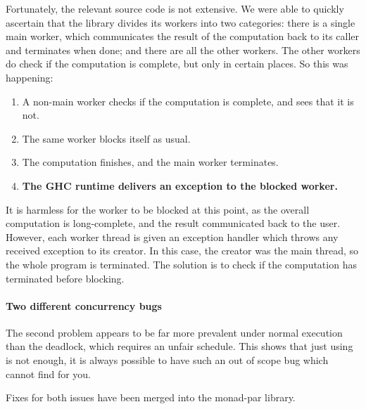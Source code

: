 Fortunately, the relevant source code is not extensive.  We were able
to quickly ascertain that the library divides its workers into two
categories: there is a single main worker, which communicates the
result of the computation back to its caller and terminates when done;
and there are all the other workers.  The other workers do check if
the computation is complete, but only in certain places.  So this was
happening:

\begin{enumerate}
\item A non-main worker checks if the computation is complete, and
  sees that it is not.
\item The same worker blocks itself as usual.
\item The computation finishes, and the main worker terminates.
\item \textbf{The GHC runtime delivers an exception to the blocked
    worker.}
\end{enumerate}

It is harmless for the worker to be blocked at this point, as the
overall computation is long-complete, and the result communicated back
to the user.  However, each worker thread is given an exception
handler which throws any received exception to its creator.  In this
case, the creator was the main thread, so the whole program is
terminated.  The solution is to check if the computation has
terminated before blocking.

\paragraph{Two different concurrency bugs}
The second problem appears to be far more prevalent under normal
execution than the deadlock, which requires an unfair schedule.  This
shows that just using \dejafu{} is not enough, it is always possible
to have such an out of scope bug which \dejafu{} cannot find for you.

Fixes for both issues have been merged into the monad-par library.

